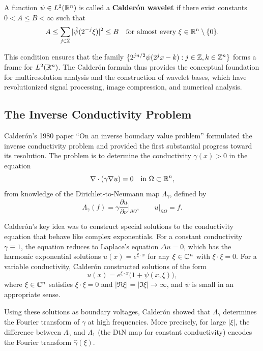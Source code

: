 \begin{definition}
A function $\psi \in L^2(\mathbb{R}^n)$ is called a \textbf{Calder\'{o}n wavelet} if there exist constants $0 < A \leq B < \infty$ such that
\[
A \leq \sum_{j \in \mathbb{Z}} |\hat\psi(2^{-j} \xi)|^2 \leq B \quad \text{for almost every } \xi \in \mathbb{R}^n \setminus \{0\}.
\]
\end{definition}

This condition ensures that the family $\{2^{jn/2} \psi(2^j x - k) : j \in \mathbb{Z}, k \in \mathbb{Z}^n\}$ forms a frame for $L^2(\mathbb{R}^n)$. The Calder\'{o}n formula thus provides the conceptual foundation for multiresolution analysis and the construction of wavelet bases, which have revolutionized signal processing, image compression, and numerical analysis.

\subsection{The Inverse Conductivity Problem}

Calder\'{o}n's 1980 paper ``On an inverse boundary value problem'' formulated the inverse conductivity problem and provided the first substantial progress toward its resolution. The problem is to determine the conductivity $\gamma(x) > 0$ in the equation
\[
\nabla \cdot (\gamma \nabla u) = 0 \quad \text{in } \Omega \subset \mathbb{R}^n,
\]
from knowledge of the Dirichlet-to-Neumann map $\Lambda_\gamma$, defined by
\[
\Lambda_\gamma(f) = \gamma \frac{\partial u}{\partial \nu}\Big|_{\partial\Omega}, \qquad u|_{\partial\Omega} = f.
\]

Calder\'{o}n's key idea was to construct special solutions to the conductivity equation that behave like complex exponentials. For a constant conductivity $\gamma \equiv 1$, the equation reduces to Laplace's equation $\Delta u = 0$, which has the harmonic exponential solutions $u(x) = e^{\xi \cdot x}$ for any $\xi \in \mathbb{C}^n$ with $\xi \cdot \xi = 0$. For a variable conductivity, Calder\'{o}n constructed solutions of the form
\[
u(x) = e^{\xi \cdot x} \bigl(1 + \psi(x, \xi)\bigr),
\]
where $\xi \in \mathbb{C}^n$ satisfies $\xi \cdot \xi = 0$ and $|\Re \xi| = |\Im \xi| \to \infty$, and $\psi$ is small in an appropriate sense.

Using these solutions as boundary voltages, Calder\'{o}n showed that $\Lambda_\gamma$ determines the Fourier transform of $\gamma$ at high frequencies. More precisely, for large $|\xi|$, the difference between $\Lambda_\gamma$ and $\Lambda_1$ (the DtN map for constant conductivity) encodes the Fourier transform $\hat\gamma(\xi)$.


